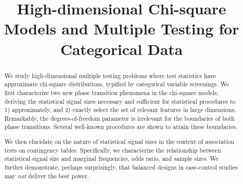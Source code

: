 \documentclass[ejs]{imsart}
\numberwithin{equation}{section}
\theoremstyle{plain}
\theoremstyle{definition}
\theoremstyle{remark}
\begin{document}
\begin{frontmatter}
\title{\Large{High-dimensional Chi-square Models and Multiple Testing for Categorical Data}} %

\begin{aug}
\author{ }

\address{Department of Statistics, University of Michigan, Ann Arbor, USA\\
}



\end{aug}

\begin{abstract}
We study high-dimensional multiple testing problems where test statistics have approximate chi-square distributions, typified by categorical variable screenings.
We first characterize two new phase transition phenomena in the chi-square models, deriving the statistical signal sizes necessary and sufficient for statistical procedures to 1) approximately, and 2) exactly select the set of relevant features in large dimensions.
Remarkably, the degrees-of-freedom parameter is irrelevant for the boundaries of both phase transitions.
Several well-known procedures are shown to attain these boundaries.

We then elucidate on the nature of statistical signal sizes in the context of association tests on contingency tables. 
Specifically, we characterize the relationship between statistical signal size and marginal frequencies, odds ratio, and sample sizes. %
We further demonstrate, perhaps surprisingly, that balanced designs in case-control studies may \emph{not} deliver the best power. %


\end{abstract}
\end{frontmatter}
\end{document}
